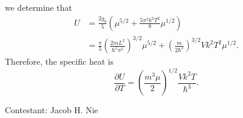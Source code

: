 \documentclass[12pt]{article}
\begin{document}
we determine that 
\begin{align}
	U &= \frac{2g_0}{5}\left( \mu^{5/2} + \frac{5\pi^2 k^2 T^2}{8}\mu^{1/2} \right)\nonumber \\
	  &= \frac{\pi}{5} \left( \frac{2mL^2}{\hbar^2 \pi^2} \right)^{3/2} \mu^{5/2} + \left( \frac{m}{2\hbar^2} \right)^{3/2} Vk^2 T^2 \mu^{1/2}.
\end{align}
Therefore, the specific heat is
\begin{equation}
	\frac{\partial U}{\partial T} = \left( \frac{m^3\mu}{2} \right)^{1/2} \frac{Vk^2T}{\hbar^3}.
\end{equation}

\vspace{1cm}

\hfill Contestant: Jacob H. Nie
\end{document}
